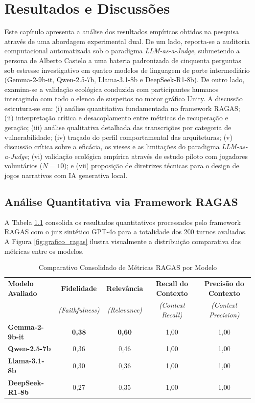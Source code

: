 \chapter{Resultados e Discussões}
\label{cap:resultados}

Este capítulo apresenta a análise dos resultados empíricos obtidos na pesquisa através de uma abordagem experimental dual. De um lado, reporta-se a auditoria computacional automatizada sob o paradigma \textit{LLM-as-a-Judge}, submetendo a persona de Alberto Castelo a uma bateria padronizada de cinquenta perguntas sob estresse investigativo em quatro modelos de linguagem de porte intermediário (Gemma-2-9b-it, Qwen-2.5-7b, Llama-3.1-8b e DeepSeek-R1-8b). De outro lado, examina-se a validação ecológica conduzida com participantes humanos interagindo com todo o elenco de suspeitos no motor gráfico Unity. A discussão estrutura-se em: (i) análise quantitativa fundamentada no framework RAGAS; (ii) interpretação crítica e desacoplamento entre métricas de recuperação e geração; (iii) análise qualitativa detalhada das transcrições por categoria de vulnerabilidade; (iv) traçado do perfil comportamental das arquiteturas; (v) discussão crítica sobre a eficácia, os vieses e as limitações do paradigma \textit{LLM-as-a-Judge}; (vi) validação ecológica empírica através de estudo piloto com jogadores voluntários ($N = 10$); e (vii) proposição de diretrizes técnicas para o design de jogos narrativos com IA generativa local.

\section{Análise Quantitativa via Framework RAGAS}
\label{sec:res_quantitativo}

A Tabela \ref{tab:ragas_geral} consolida os resultados quantitativos processados pelo framework RAGAS com o juiz sintético GPT-4o para a totalidade dos 200 turnos avaliados. A Figura \ref{fig:grafico_ragas} ilustra visualmente a distribuição comparativa das métricas entre os modelos.

\begin{table}[htbp]
\centering
\caption{Comparativo Consolidado de Métricas RAGAS por Modelo}
\vspace{0.2cm}
\label{tab:ragas_geral}
\small
\renewcommand{\arraystretch}{1.3}
\begin{tabularx}{\textwidth}{|X|c|c|c|c|}
\hline
\textbf{Modelo Avaliado} & \textbf{Fidelidade} & \textbf{Relevância} & \textbf{Recall do Contexto} & \textbf{Precisão do Contexto} \\
 & \textit{(Faithfulness)} & \textit{(Relevance)} & \textit{(Context Recall)} & \textit{(Context Precision)} \\ \hline
\textbf{Gemma-2-9b-it} & \textbf{0,38} & \textbf{0,60} & 1,00 & 1,00 \\ \hline
\textbf{Qwen-2.5-7b} & 0,36 & 0,46 & 1,00 & 1,00 \\ \hline
\textbf{Llama-3.1-8b} & 0,30 & 0,36 & 1,00 & 1,00 \\ \hline
\textbf{DeepSeek-R1-8b} & 0,27 & 0,35 & 1,00 & 1,00 \\ \hline
\end{tabularx}
\end{table}

